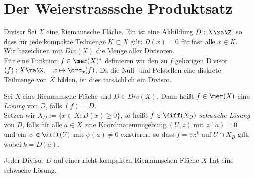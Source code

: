 
\section{Der Weierstrasssche Produktsatz}
\label{sec:Weierstrass}

\begin{defin}{Divisor}
  Sei $X$ eine Riemannsche Fläche. Ein  ist eine
  Abbildung $D: X \ra \Z$, so dass für jede kompakte Teilmenge $K
  \subset X$ gilt: $D(x) = 0$ für fast alle $x \in K$. \\
  Wir bezeichnen mit $Div(X)$ die Menge aller Divisoren. \\
  Für eine Funktion $f \in \mer(X)^\ast$ definieren wir den zu $f$
  gehörigen Divisor $(f): X \ra \Z, \quad x \mapsto \ord_x(f)$. Da die
  Null- und Polstellen eine diskrete Teilmenge von $X$ bilden, ist
  dies tatsächlich ein Divisor.
\end{defin}

\begin{defin}
  Sei $X$ eine Riemannsche Fläche und $D \in Div(X)$. Dann heißt $f
  \in \mer(X)$ eine \emph{Lösung} von $D$, falls $(f) = D$. \\
  Setzen wir $X_D := \{x \in X: D(x) \geq 0 \}$, so heißt $f \in
  \diff(X_D)$ \emph{schwache Lösung} von $D$, falls für alle $a \in X$
  eine Koordinatenumgebung $(U,z)$ mit $z(a) = 0$ und ein $\psi \in
  \diff(U)$ mit $\psi(a) \neq 0$ existieren, so dass $f = \psi z^k$
  auf $ U \cap X_D$ gilt, wobei $k = D(a)$.
\end{defin}

\begin{lemma}
  \label{lemma:schwache-Lösung-Divisor}
  Jeder Divisor $D$ auf einer nicht kompakten Riemannschen Fläche $X$ hat eine
  schwache Lösung.
\end{lemma}

